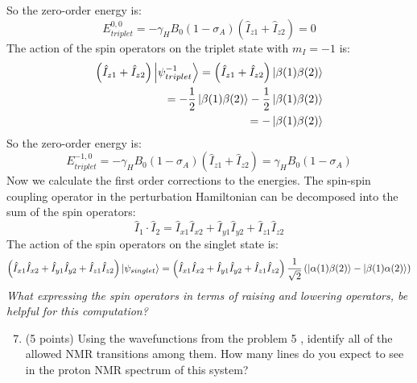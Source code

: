 \documentclass[12pt]{article}
\begin{document}
So the zero-order energy is:
\begin{equation}
  E_{triplet}^{0,0} = -\gamma_{H} B_{0}\left(1-\sigma_{A}\right)\left(\hat{I}_{z 1}+\hat{I}_{z 2}\right) = 0
\end{equation}
The action of the spin operators on the triplet state with $m_I = -1$ is:
\begin{align}
  \left(\hat{I}_{z 1} + \hat{I}_{z 2}\right) \ket{\psi_{triplet}^{-1}} = \left(\hat{I}_{z 1} + \hat{I}_{z 2}\right) \ket{\beta(1)\beta(2)}\\
  = -\frac{1}{2} \ket{\beta(1)\beta(2)} - \frac{1}{2} \ket{\beta(1)\beta(2)}\\
  = -\ket{\beta(1)\beta(2)}
\end{align}
So the zero-order energy is:
\begin{equation}
  E_{triplet}^{-1,0} = -\gamma_{H} B_{0}\left(1-\sigma_{A}\right)\left(\hat{I}_{z 1}+\hat{I}_{z 2}\right) = \gamma_{H} B_{0}\left(1-\sigma_{A}\right)
\end{equation}
Now we calculate the first order corrections to the energies. The spin-spin coupling operator in the perturbation Hamiltonian can be decomposed into the sum of the spin operators:
\begin{equation}
  \hat{I}_{1} \cdot \hat{I}_{2} = \hat{I}_{x 1} \hat{I}_{x 2} + \hat{I}_{y 1} \hat{I}_{y 2} + \hat{I}_{z 1} \hat{I}_{z 2}
\end{equation}
The action of the spin operators on the singlet state is:
\begin{align}
  \left(\hat{I}_{x 1} \hat{I}_{x 2} + \hat{I}_{y 1} \hat{I}_{y 2} + \hat{I}_{z 1} \hat{I}_{z 2}\right) \ket{\psi_{singlet}} = \left(\hat{I}_{x 1} \hat{I}_{x 2} + \hat{I}_{y 1} \hat{I}_{y 2} + \hat{I}_{z 1} \hat{I}_{z 2}\right) \frac{1}{\sqrt{2}} \left( \ket{\alpha(1)\beta(2)} - \ket{\beta(1)\alpha(2)} \right)\\
\end{align}
\emph{What expressing the spin operators in terms of raising and lowering operators, be helpful for this computation?}
\begin{enumerate}
  \setcounter{enumi}{6}
  \item (5 points) Using the wavefunctions from the problem 5 , identify all of the allowed NMR transitions among them. How many lines do you expect to see in the proton NMR spectrum of this system?
\end{enumerate}
\end{document}
